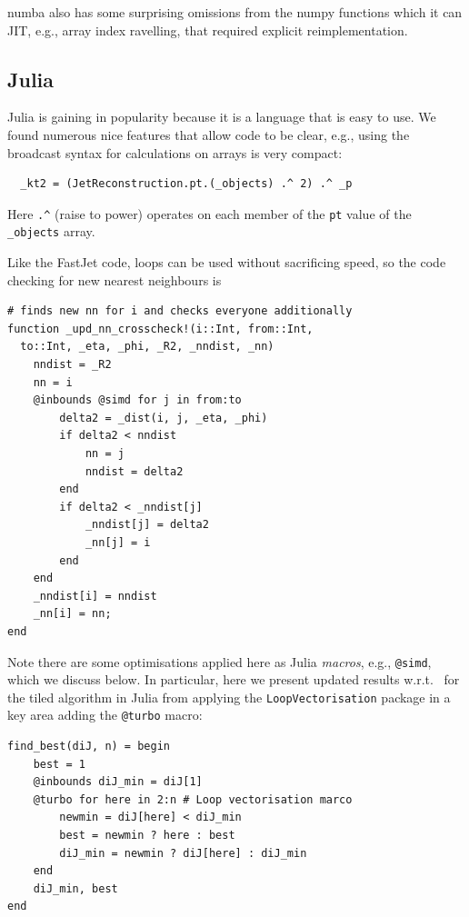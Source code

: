 \documentclass{webofc}
\begin{document}
numba also has some surprising omissions from the numpy functions which it can
JIT, e.g., array index ravelling, that required explicit reimplementation.

\subsection{Julia}
\label{sec:julia-ergonomics}

Julia is gaining in popularity because it is a language that is easy to use.
We found numerous nice features that allow code to be clear, e.g., using the
broadcast syntax for calculations on arrays is very compact:

\begin{verbatim}
  _kt2 = (JetReconstruction.pt.(_objects) .^ 2) .^ _p
\end{verbatim}

Here \texttt{.\^} (raise to power) operates on each member of the \texttt{pt}
value of the \texttt{\_objects} array.

Like the FastJet code, loops can be used without sacrificing speed, so the code checking for new nearest neighbours is

\begin{verbatim}
# finds new nn for i and checks everyone additionally
function _upd_nn_crosscheck!(i::Int, from::Int, 
  to::Int, _eta, _phi, _R2, _nndist, _nn)
    nndist = _R2
    nn = i
    @inbounds @simd for j in from:to
        delta2 = _dist(i, j, _eta, _phi)
        if delta2 < nndist
            nn = j
            nndist = delta2
        end
        if delta2 < _nndist[j]
            _nndist[j] = delta2
            _nn[j] = i
        end
    end
    _nndist[i] = nndist
    _nn[i] = nn;
end
\end{verbatim}

Note there are some optimisations applied here as Julia \emph{macros}, e.g.,
\texttt{@simd}, which we discuss below. In particular, here we present
updated results w.r.t.~\cite{polyglot-jets-conference} for the tiled algorithm in
Julia from applying the \texttt{LoopVectorisation} package in a key area adding
the \texttt{@turbo} macro:

\begin{verbatim}
find_best(diJ, n) = begin
    best = 1
    @inbounds diJ_min = diJ[1]
    @turbo for here in 2:n # Loop vectorisation marco
        newmin = diJ[here] < diJ_min
        best = newmin ? here : best
        diJ_min = newmin ? diJ[here] : diJ_min
    end
    diJ_min, best
end
\end{verbatim}
\end{document}
